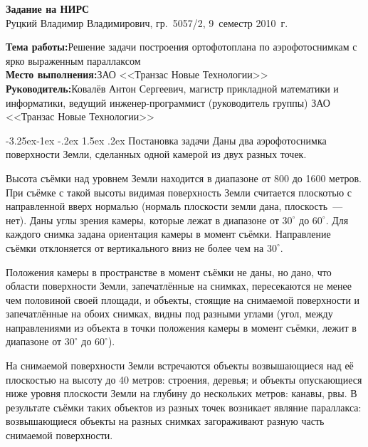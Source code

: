 \documentclass[a4paper,10pt]{article}
\makeatletter
\renewcommand\paragraph{\@startsection{paragraph}{4}{\z@}%
  {-3.25ex\@plus -1ex \@minus -.2ex}%
  {1.5ex \@plus .2ex}%
  {\normalfont\normalsize\bfseries}}
\makeatother
\begin{document}

\begin{center}
\begin{spacing}{1.3}
  {\Large\bfseries Задание на НИРС} \\
  {\large Руцкий Владимир Владимирович, гр.~5057/2, 9~семестр 2010~г.}
\end{spacing}
\end{center}

\noindent\textbf{Тема работы:}\quad Решение задачи построения ортофотоплана по аэрофотоснимкам с ярко выраженным параллаксом \\
\textbf{Место выполнения:}\quad ЗАО <<Транзас Новые Технологии>> \\
\textbf{Руководитель:}\quad Ковалёв Антон Сергеевич, 
магистр прикладной математики и информатики, 
ведущий инженер-программист (руководитель группы) ЗАО <<Транзас Новые Технологии>>

\paragraph{Постановка задачи}
Даны два аэрофотоснимка поверхности Земли, сделанных одной камерой из двух разных точек.

Высота съёмки над уровнем Земли находится в диапазоне от 800 до 1600 метров.
При съёмке с такой высоты видимая поверхность Земли считается плоскотью с направленной вверх нормалью 
(нормаль плоскости земли дана, плоскость~--- нет).
Даны углы зрения камеры, которые лежат в диапазоне от $30^{\circ}$ до $60^{\circ}$.
Для каждого снимка задана ориентация камеры в момент съёмки.
Направление съёмки отклоняется от вертикального вниз не более чем на $30^{\circ}$.

Положения камеры в пространстве в момент съёмки не даны, но
дано, что области поверхности Земли, запечатлённые на снимках, пересекаются не менее чем половиной своей площади,
и объекты, стоящие на снимаемой поверхности и запечатлённые на обоих снимках, видны под разными углами 
(угол, между направлениями из объекта в точки положения камеры в момент съёмки, 
лежит в диапазоне от $30^{\circ}$ до $60^{\circ}$).

На снимаемой поверхности Земли встречаются объекты возвышающиеся над её плоскостью на высоту до 40 метров: 
строения, деревья; 
и объекты опускающиеся ниже уровня плоскости Земли на глубину до нескольких метров: канавы, рвы.
В результате съёмки таких объектов из разных точек возникает являние параллакса:
возвышающиеся объекты на разных снимках загораживают разную часть снимаемой поверхности.
\end{document}
